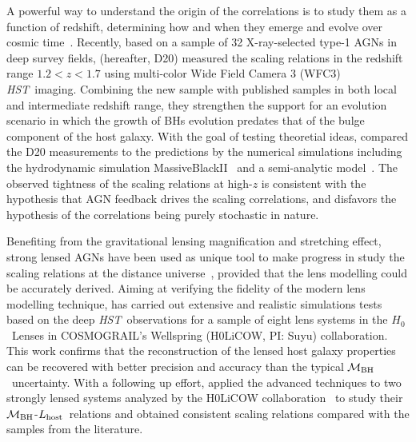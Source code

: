\documentclass[fleqn,usenatbib]{mnras}
\newcommand{\hst}{{\it HST}}
\newcommand{\hc}{$H_0$}
\newcommand{\mbh}{$\mathcal M_{\rm BH}$}
\newcommand{\lhost}{$L_{\rm host}$}
\begin{document}
A powerful way to understand the origin of the correlations is to study them as a function of redshift, determining how and when they emerge and evolve over cosmic time~\citep[e.g.,][]{TMB04,Sal++06,Woo++06, Jah++09,SS13,Sun2015, Park15}. Recently, based on a sample of 32 X-ray-selected type-1 AGNs in deep survey fields, \citet{Ding2020a} (hereafter, D20) measured the scaling relations in the redshift range $1.2<z<1.7$ using multi-color Wide Field Camera 3 (WFC3) \hst\ imaging. Combining the new sample with published samples in both local and intermediate redshift range, they strengthen the support for an evolution scenario in which the growth of BHs evolution predates that of  the bulge component of the host galaxy. With the goal of testing theoretial ideas, \citet{Ding2020b} compared the D20 measurements to the predictions by the numerical simulations including the hydrodynamic simulation MassiveBlackII~\citep{Khandai2015} and a semi-analytic model~\citep{Menci2014}. The observed tightness of the  scaling relations at high-$z$ is consistent with the hypothesis that AGN feedback drives the scaling correlations, and disfavors the hypothesis of the correlations being purely stochastic in nature. 

Benefiting from the gravitational lensing magnification and stretching effect, strong lensed AGNs have been used as unique tool to make progress in study the scaling relations at the distance universe~\citep{Peng2006}, provided that the lens modelling could be accurately derived. Aiming at verifying the fidelity of the modern lens modelling technique, \citet{Ding2017a} has carried out extensive and realistic simulations tests based on the deep \hst\ observations for a sample of eight lens systems in the \hc\ Lenses in COSMOGRAIL's Wellspring (H0LiCOW, PI: Suyu) collaboration. This work confirms that the reconstruction of the lensed host galaxy properties can be recovered with better precision and accuracy than the typical \mbh\ uncertainty. With a following up effort, \citet{Ding2017b} applied the advanced techniques to two strongly lensed systems analyzed by the H0LiCOW collaboration~\citep{Suyu2013, Wong2017} to study their \mbh-\lhost\ relations and obtained consistent scaling relations compared with the samples from the literature.
\end{document}
